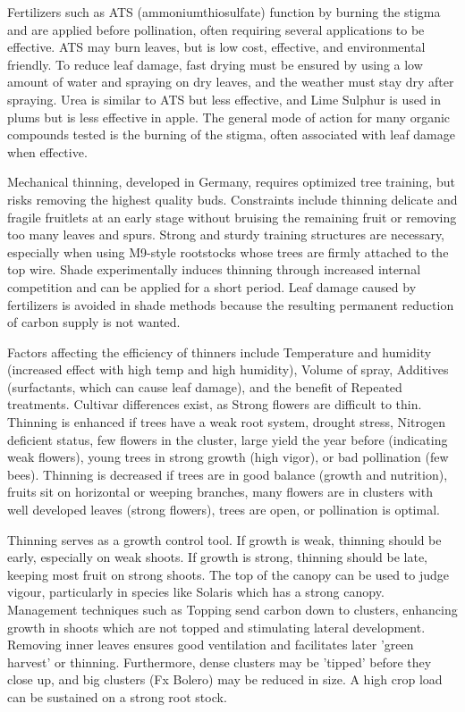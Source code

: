 \vspace{0.5em}
Fertilizers such as ATS (ammoniumthiosulfate) function by burning the stigma and are applied before pollination, often requiring several applications to be effective. ATS may burn leaves, but is low cost, effective, and environmental friendly. To reduce leaf damage, fast drying must be ensured by using a low amount of water and spraying on dry leaves, and the weather must stay dry after spraying. Urea is similar to ATS but less effective, and Lime Sulphur is used in plums but is less effective in apple. The general mode of action for many organic compounds tested is the burning of the stigma, often associated with leaf damage when effective.

\vspace{0.5em}
Mechanical thinning, developed in Germany, requires optimized tree training, but risks removing the highest quality buds. Constraints include thinning delicate and fragile fruitlets at an early stage without bruising the remaining fruit or removing too many leaves and spurs. Strong and sturdy training structures are necessary, especially when using M9-style rootstocks whose trees are firmly attached to the top wire. Shade experimentally induces thinning through increased internal competition and can be applied for a short period. Leaf damage caused by fertilizers is avoided in shade methods because the resulting permanent reduction of carbon supply is not wanted.

\vspace{0.5em}
Factors affecting the efficiency of thinners include Temperature and humidity (increased effect with high temp and high humidity), Volume of spray, Additives (surfactants, which can cause leaf damage), and the benefit of Repeated treatments. Cultivar differences exist, as Strong flowers are difficult to thin. Thinning is enhanced if trees have a weak root system, drought stress, Nitrogen deficient status, few flowers in the cluster, large yield the year before (indicating weak flowers), young trees in strong growth (high vigor), or bad pollination (few bees). Thinning is decreased if trees are in good balance (growth and nutrition), fruits sit on horizontal or weeping branches, many flowers are in clusters with well developed leaves (strong flowers), trees are open, or pollination is optimal.

\vspace{0.5em}
Thinning serves as a growth control tool. If growth is weak, thinning should be early, especially on weak shoots. If growth is strong, thinning should be late, keeping most fruit on strong shoots. The top of the canopy can be used to judge vigour, particularly in species like Solaris which has a strong canopy. Management techniques such as Topping send carbon down to clusters, enhancing growth in shoots which are not topped and stimulating lateral development. Removing inner leaves ensures good ventilation and facilitates later 'green harvest' or thinning. Furthermore, dense clusters may be 'tipped' before they close up, and big clusters (Fx Bolero) may be reduced in size. A high crop load can be sustained on a strong root stock.


